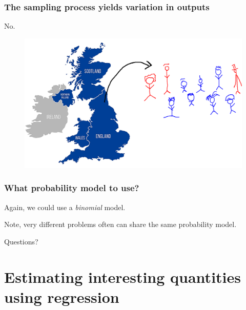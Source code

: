 \documentclass[handout]{beamer}
\begin{document}
\begin{frame}
	\frametitle{The sampling process yields variation in outputs}
	No.
	
	\begin{figure}[ht]
		\centerline{\includegraphics[width=1\textwidth]{../figures/uk-population.pdf}}
	\end{figure}
	
\end{frame}

\begin{frame}
	\frametitle{What probability model to use?}
	
	Again, we could use a \textit{binomial} model.
	
	\vspace{0.5cm}
	
	Note, very different problems often can share the same probability model.
	
\end{frame}

\begin{frame}
	
	\Large Questions?
\end{frame}

\section{Estimating interesting quantities using regression}
\frame{\tableofcontents[currentsection]}
\end{document}
